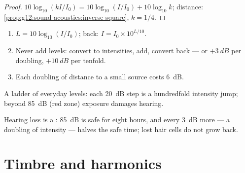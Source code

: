 \begin{proof}
$10\log_{10}(kI/I_0) = 10\log_{10}(I/I_0) + 10\log_{10}k$;
distance: \cref{prop:g12:sound-acoustics:inverse-square}, $k = 1/4$.
\end{proof}

\begin{method}\label{met:g12:sound-acoustics:db}
\begin{enumerate}
  \item $L = 10\log_{10}(I/I_0)$; back: $I = I_0 \times 10^{L/10}$.
  \item Never add levels: convert to intensities, add, convert back
        --- or $+\qty{3}{dB}$ per doubling, $+\qty{10}{dB}$ per tenfold.
  \item Each doubling of distance to a small source costs \qty{6}{dB}.
\end{enumerate}
\end{method}

\begin{omfigure}

{\small A ladder of everyday levels: each \qty{20}{dB} step is a
hundredfold intensity jump; beyond \qty{85}{dB} (red zone) exposure
damages hearing.}
\end{omfigure}

\begin{remark}\label{rem:g12:sound-acoustics:damage}
Hearing loss is a : \qty{85}{dB} is safe for eight hours, and
every \qty{3}{dB} more --- a doubling of intensity --- halves the
safe time; lost hair cells do not grow back.
\end{remark}

\section{Timbre and harmonics}


